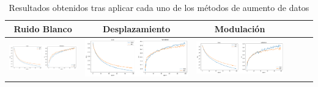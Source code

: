 \documentclass[11pt,a4paper,spanish]{book}
\begin{document}
		\begin{table}[H]
			\centering
			\begin{center}
				\begin{tabular}{| c | c | c | c | c | c |}
					\hline
					Ruido Blanco & Desplazamiento & Modulación \\ 
					\hline
					\includegraphics[scale=0.15]{results/white_noise2.png} & \includegraphics[scale=0.15]{results/shiftting_2.png} & \includegraphics[scale=0.15]{results/pitch_2.png}\\
					
					\hline	
				\end{tabular}
				\caption{Resultados obtenidos tras aplicar cada uno de los métodos de aumento de datos}
				\label{tab:augmentationData_2}
			\end{center}
		\end{table}
	\printbibliography
	
\end{document}
